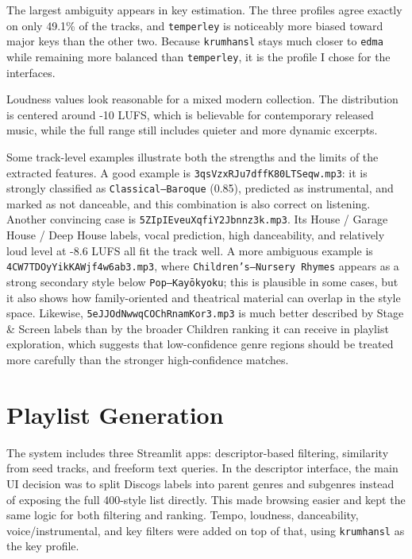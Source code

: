 \documentclass[11pt,a4paper]{article}
\newcommand{\code}[1]{\texttt{#1}}
\begin{document}
The largest ambiguity appears in key estimation. The three profiles agree exactly on only 49.1\% of the tracks, and \code{temperley} is noticeably more biased toward major keys than the other two. Because \code{krumhansl} stays much closer to \code{edma} while remaining more balanced than \code{temperley}, it is the profile I chose for the interfaces.

Loudness values look reasonable for a mixed modern collection. The distribution is centered around -10 LUFS, which is believable for contemporary released music, while the full range still includes quieter and more dynamic excerpts.

Some track-level examples illustrate both the strengths and the limits of the extracted features. A good example is \code{3qsVzxRJu7dffK80LTSeqw.mp3}: it is strongly classified as \code{Classical---Baroque} (0.85), predicted as instrumental, and marked as not danceable, and this combination is also correct on listening. Another convincing case is \code{5ZIpIEveuXqfiY2Jbnnz3k.mp3}. Its House / Garage House / Deep House labels, vocal prediction, high danceability, and relatively loud level at -8.6 LUFS all fit the track well. A more ambiguous example is \code{4CW7TDOyYikKAWjf4w6ab3.mp3}, where \code{Children's---Nursery Rhymes} appears as a strong secondary style below \code{Pop---Kay\={o}kyoku}; this is plausible in some cases, but it also shows how family-oriented and theatrical material can overlap in the style space. Likewise, \code{5eJJOdNwwqCOChRnamKor3.mp3} is much better described by Stage \& Screen labels than by the broader Children ranking it can receive in playlist exploration, which suggests that low-confidence genre regions should be treated more carefully than the stronger high-confidence matches.

\section{Playlist Generation}

The system includes three Streamlit apps: descriptor-based filtering, similarity from seed tracks, and freeform text queries. In the descriptor interface, the main UI decision was to split Discogs labels into parent genres and subgenres instead of exposing the full 400-style list directly. This made browsing easier and kept the same logic for both filtering and ranking. Tempo, loudness, danceability, voice/instrumental, and key filters were added on top of that, using \code{krumhansl} as the key profile.
\end{document}
